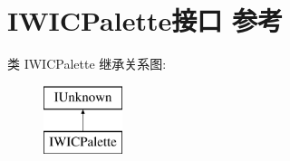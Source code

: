 \hypertarget{interface_i_w_i_c_palette}{}\section{I\+W\+I\+C\+Palette接口 参考}
\label{interface_i_w_i_c_palette}
类 I\+W\+I\+C\+Palette 继承关系图\+:\begin{figure}[H]
\begin{center}
\leavevmode
\includegraphics[height=2.000000cm]{interface_i_w_i_c_palette}
\end{center}
\end{figure}
